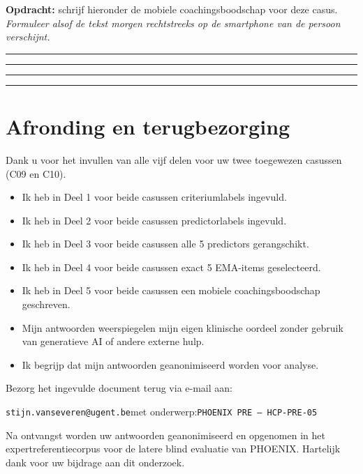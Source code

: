\documentclass[11pt,a4paper]{article}
\newcommand{\writeline}{\vspace{0.22em}\noindent\rule{\linewidth}{0.25pt}\vspace{0.42em}\par}
\newcommand{\messagelines}{\writeline\writeline\writeline\writeline}
\begin{document}
\begin{responsebox}
\small\textbf{Opdracht:} schrijf hieronder de mobiele coachingsboodschap voor deze casus.
\textit{Formuleer alsof de tekst morgen rechtstreeks op de smartphone van de persoon verschijnt.}

\messagelines
\end{responsebox}

\vspace{0.6em}
\newpage


\section{Afronding en terugbezorging}

Dank u voor het invullen van alle vijf delen voor uw twee toegewezen casussen
(C09 en C10).

\begin{instrbox}[title=Checklist voor terugbezorging]
\begin{itemize}
\item[$\square$] Ik heb in Deel 1 voor beide casussen criteriumlabels ingevuld.
\item[$\square$] Ik heb in Deel 2 voor beide casussen predictorlabels ingevuld.
\item[$\square$] Ik heb in Deel 3 voor beide casussen alle 5 predictors gerangschikt.
\item[$\square$] Ik heb in Deel 4 voor beide casussen exact 5 EMA-items geselecteerd.
\item[$\square$] Ik heb in Deel 5 voor beide casussen een mobiele coachingsboodschap geschreven.
\item[$\square$] Mijn antwoorden weerspiegelen mijn eigen klinische oordeel zonder gebruik van generatieve AI of andere externe hulp.
\item[$\square$] Ik begrijp dat mijn antwoorden geanonimiseerd worden voor analyse.
\end{itemize}
\end{instrbox}

\medskip
Bezorg het ingevulde document terug via e-mail aan:
\begin{center}
\texttt{stijn.vanseveren@ugent.be}\quad met onderwerp:\quad \texttt{PHOENIX PRE --- HCP-PRE-05}
\end{center}

\vspace{0.5em}
\begin{tcolorbox}[colback=AccentBlue,colframe=PrimaryBlue,arc=2mm,boxrule=0.6pt,left=8pt,right=8pt,top=7pt,bottom=7pt]
\small\centering
Na ontvangst worden uw antwoorden geanonimiseerd en opgenomen in het expertreferentiecorpus
voor de latere blind evaluatie van PHOENIX. Hartelijk dank voor uw bijdrage aan dit onderzoek.
\end{tcolorbox}
\end{document}
